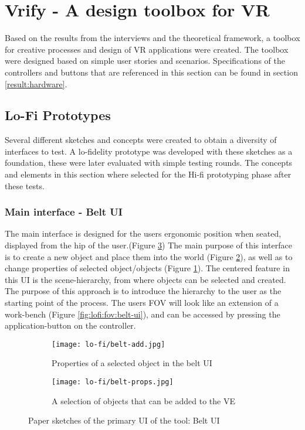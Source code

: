 \section{Vrify - A design toolbox for VR}
Based on the results from the interviews and the theoretical framework, a toolbox for creative processes and design of VR applications were created. The toolbox were designed based on simple user stories and scenarios. Specifications of the controllers and buttons that are referenced in this section can be found in section \ref{result:hardware}.

\subsection{Lo-Fi Prototypes}
 Several different sketches and concepts were created to obtain a diversity of interfaces to test. A lo-fidelity prototype was developed with these sketches as a foundation, these were later evaluated with simple testing rounds. The concepts and elements in this section where selected for the Hi-fi prototyping phase after these tests.

\subsubsection{Main interface - Belt UI}
The main interface is designed for the users ergonomic position when seated, displayed from the hip of the user.(Figure \ref{fig:lofi:belt-ui}) The main purpose of this interface is to create a new object and place them into the world (Figure \ref{fig:lofi:belt-ui:add}), as well as to change properties of selected object/objects (Figure \ref{fig:lofi:belt-ui:props}). The centered feature in this UI is the scene-hierarchy, from where objects can be selected and created. The purpose of this approach is to introduce the hierarchy to the user as the starting point of the process. The users FOV will look like an extension of a work-bench (Figure \ref{fig:lofi:fov:belt-ui}), and can be accessed by pressing the application-button on the controller.

\begin{figure}
\begin{subfigure}{.5\textwidth}
  \centering
  \texttt{[image: lo-fi/belt-add.jpg]}
  \caption{Properties of a selected object in the belt UI}
  \label{fig:lofi:belt-ui:props}
\end{subfigure}%
\begin{subfigure}{.5\textwidth}
  \centering
  \texttt{[image: lo-fi/belt-props.jpg]}
  \caption{A selection of objects that can be added to the VE}
  \label{fig:lofi:belt-ui:add}
\end{subfigure}
\caption{Paper sketches of the primary UI of the tool: Belt UI}
\label{fig:lofi:belt-ui}
\end{figure}

